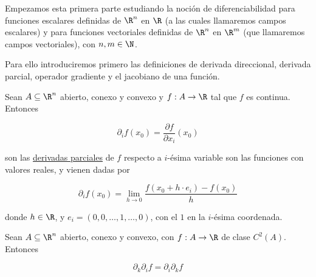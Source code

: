 Empezamos esta primera parte estudiando la noción de diferenciabilidad para funciones escalares definidas de $\R^n$ en $\R$ (a las cuales llamaremos campos escalares) y para funciones vectoriales definidas de $\R^n$ en $\R^m$ (que llamaremos campos vectoriales), con $n,m \in \N$.

Para ello introduciremos primero las definiciones de derivada direccional, derivada parcial, operador gradiente y el jacobiano de una función.

\begin{defn}
    Sean $A \subseteq \R^n$ abierto, conexo y convexo y $f: A \rightarrow \R$ tal que $f$ es continua. Entonces
    
    \[
    \partial_i f(x_0) = \frac{\partial f}{\partial x_i}(x_0)
    \]
    
    \noindent son las \ul{derivadas parciales} de $f$ respecto a $i$-ésima variable son las funciones con valores reales, y vienen dadas por
    
    \[
    \partial_i f(x_0) = \lim_{h \to 0} \frac{f(x_0 + h \cdot e_i) - f(x_0)}{h}
    \]
    
    \noindent donde $h \in \R$, y $e_i = (0, 0, \dots, 1, \dots, 0)$, con el $1$ en la $i$-ésima coordenada.
\end{defn}

\begin{teo}
    Sean $A \subseteq \R^n$ abierto, conexo y convexo, con $f: A \rightarrow \R$ de clase $C^2(A)$. Entonces
    
    \[
    \partial_k\partial_if = \partial_i\partial_kf
    \]
\end{teo}

